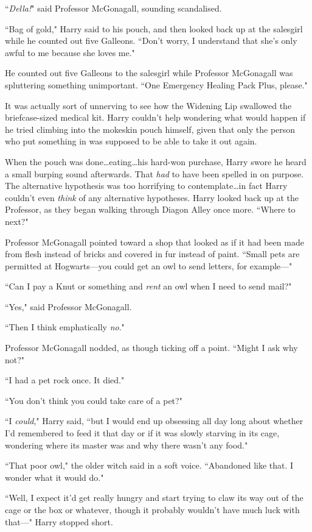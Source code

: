 ``\emph{Della!}" said Professor McGonagall, sounding scandalised.

``Bag of gold," Harry said to his pouch, and then looked back up at the salesgirl while he counted out five Galleons. ``Don't worry, I understand that she's only awful to me because she loves me."

He counted out five Galleons to the salesgirl while Professor McGonagall was spluttering something unimportant. ``One Emergency Healing Pack Plus, please."

It was actually sort of unnerving to see how the Widening Lip swallowed the briefcase-sized medical kit. Harry couldn't help wondering what would happen if he tried climbing into the mokeskin pouch himself, given that only the person who put something in was supposed to be able to take it out again.

When the pouch was done…eating…his hard-won purchase, Harry swore he heard a small burping sound afterwards. That \emph{had} to have been spelled in on purpose. The alternative hypothesis was too horrifying to contemplate…in fact Harry couldn't even \emph{think} of any alternative hypotheses. Harry looked back up at the Professor, as they began walking through Diagon Alley once more. ``Where to next?"

Professor McGonagall pointed toward a shop that looked as if it had been made from flesh instead of bricks and covered in fur instead of paint. ``Small pets are permitted at Hogwarts—you could get an owl to send letters, for example—"

``Can I pay a Knut or something and \emph{rent} an owl when I need to send mail?"

``Yes," said Professor McGonagall.

``Then I think emphatically \emph{no}."

Professor McGonagall nodded, as though ticking off a point. ``Might I ask why not?"

``I had a pet rock once. It died."

``You don't think you could take care of a pet?"

``I \emph{could}," Harry said, ``but I would end up obsessing all day long about whether I'd remembered to feed it that day or if it was slowly starving in its cage, wondering where its master was and why there wasn't any food."

``That poor owl," the older witch said in a soft voice. ``Abandoned like that. I wonder what it would do."

``Well, I expect it'd get really hungry and start trying to claw its way out of the cage or the box or whatever, though it probably wouldn't have much luck with that—" Harry stopped short.


